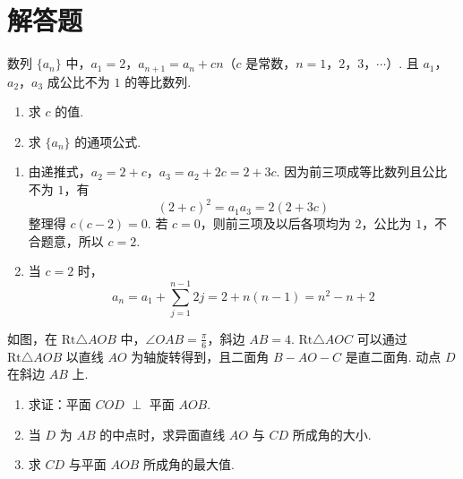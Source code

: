 \section{解答题}
\begin{problem}
数列 \( \{a_{n}\} \) 中，\(a_{1}=2\)，\(a_{n+1}=a_{n}+cn\)（\(c\) 是常数，\(n=1\)，\(2\)，\(3\)，\(\cdots\)）. 且 \(a_{1}\)，\(a_{2}\)，\(a_{3}\) 成公比不为 \(1\) 的等比数列.

\begin{enumerate}
\item 求 \(c\) 的值.
\item 求 \( \{a_{n}\} \) 的通项公式.
\end{enumerate}
\end{problem}

\begin{solution}
\begin{enumerate}
\item 由递推式，\(a_2=2+c\)，\(a_3=a_2+2c=2+3c\). 因为前三项成等比数列且公比不为 \(1\)，有
\[
(2+c)^2=a_1a_3=2(2+3c)
\]
整理得 \(c(c-2)=0\). 若 \(c=0\)，则前三项及以后各项均为 \(2\)，公比为 \(1\)，不合题意，所以 \(c=2\).
\item 当 \(c=2\) 时，
\[
a_n=a_1+\sum_{j=1}^{n-1}2j
=2+n(n-1)=n^2-n+2
\]
\end{enumerate}
\end{solution}

\begin{problem}
如图，在 \(\mathrm{Rt}\triangle AOB\) 中，\(\angle OAB = \frac{\pi}{6}\)，斜边 \(AB = 4\). \(\mathrm{Rt}\triangle AOC\) 可以通过 \(\mathrm{Rt}\triangle AOB\) 以直线 \(AO\) 为轴旋转得到，且二面角 \(B-AO-C\) 是直二面角. 动点 \(D\) 在斜边 \(AB\) 上.

\begin{enumerate}
\item 求证：平面 \(COD\) \(\perp\) 平面 \(AOB\).
\item 当 \(D\) 为 \(AB\) 的中点时，求异面直线 \(AO\) 与 \(CD\) 所成角的大小.
\item 求 \(CD\) 与平面 \(AOB\) 所成角的最大值.
\end{enumerate}

\end{problem}

